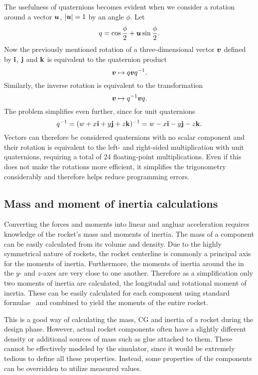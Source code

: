 The usefulness of quaternions becomes evident when we consider a
rotation around a vector $\boldsymbol{u}$, $|\boldsymbol{u}|=1$ by an angle $\phi$.
Let
%
\begin{equation}
q = \cos\frac{\phi}{2} + \boldsymbol{u} \sin\frac{\phi}{2}.
\label{eq-rotation-quaternion}
\end{equation}
%
Now the previously mentioned rotation of a three-dimensional vector
$\boldsymbol{v}$ defined by $\mathbf{i}$, $\mathbf{j}$ and $\mathbf{k}$ is equivalent to the
quaternion product
%
\begin{equation}
\boldsymbol{v} \mapsto q\boldsymbol{v} q^{-1}.
\end{equation}
%
Similarly, the inverse rotation is equivalent to the transformation
%
\begin{equation}
\boldsymbol{v} \mapsto q^{-1} \boldsymbol{v} q.
\end{equation}
%
The problem simplifies even further, since for unit quaternions
%
\begin{equation}
q^{-1} = (w + x\mathbf{i} + y\mathbf{j} + z\mathbf{k})^{-1} = w - x\mathbf{i} - y\mathbf{j} - z\mathbf{k}.
\end{equation}
%
Vectors can therefore be considered quaternions with no scalar
component and their rotation is equivalent to the left- and right-sided
multiplication with unit quaternions, requiring a total of 24
floating-point multiplications.  Even if this does not make the
rotations more efficient, it simplifies the trigonometry considerably
and therefore helps reduce programming errors.


\subsection{Mass and moment of inertia calculations}
\label{sec-mass-inertia}

Converting the forces and moments into linear and angluar acceleration
requires knowledge of the rocket's mass and moments of inertia.  The
mass of a component can be easily calculated from its volume and
density.  Due to the highly symmetrical nature of rockets, the rocket
centerline is commonly a principal axis for the moments of inertia.
Furthermore, the moments of inertia around the in the $y$- and
$z$-axes are very close to one another.  Therefore as a simplification
only two moments of inertia are calculated, the longitudal and
rotational moment of inertia.  These can be easily calculated for each
component using standard formulae~\cite{wiki-moments-of-inertia} and
combined to yield the moments of the entire rocket.

This is a good way of calculating the mass, CG and inertia of a rocket
during the design phase.  However, actual rocket components often have
a slightly different density or additional sources of mass such as
glue attached to them.  These cannot be effectively modeled by the
simulator, since it would be extremely tedious to define all these
properties.  Instead, some properties of the components can be
overridden to utilize measured values.

